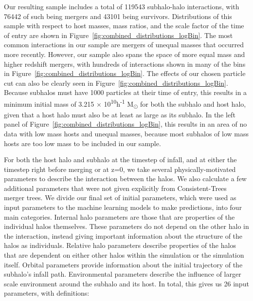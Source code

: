 \documentclass[fleqn,usenatbib]{mnras}
\begin{document}
    Our resulting sample includes a total of 119543 subhalo-halo interactions, with 76442 of such being mergers and 43101 being survivors. Distributions of this sample with respect to host masses, mass ratios, and the scale factor of the time of entry are shown in Figure~\ref{fig:combined_distributions_logBin}. The most common interactions in our sample are mergers of unequal masses that occurred more recently. However, our sample also spans the space of more equal mass and higher redshift mergers, with hundreds of interactions shown in many of the bins in Figure~\ref{fig:combined_distributions_logBin}. The effects of our chosen particle cut can also be clearly seen in Figure~\ref{fig:combined_distributions_logBin}. Because subhalos must have 1000 particles at their time of entry, this results in a minimum initial mass of 3.215 $\times$ 10\textsuperscript{10}h\textsuperscript{-1} M\textsubscript{\(\odot\)} for both the subhalo and host halo, given that a host halo must also be at least as large as its subhalo. In the left panel of Figure~\ref{fig:combined_distributions_logBin}, this results in an area of no data with low mass hosts and unequal masses, because most subhalos of low mass hosts are too low mass to be included in our sample.
\par
    For both the host halo and subhalo at the timestep of infall, and at either the timestep right before merging or at z=0, we take several physically-motivated parameters to describe the interaction between the halos. We also calculate a few additional parameters that were not given explicitly from Consistent-Trees merger trees. We divide our final set of initial parameters, which were used as input parameters to the machine learning models to make predictions, into four main categories. Internal halo parameters are those that are properties of the individual halos themselves. These parameters do not depend on the other halo in the interaction, instead giving important information about the structure of the halos as individuals. Relative halo parameters describe properties of the halos that are dependent on either other halos within the simulation or the simulation itself. Orbital parameters provide information about the initial trajectory of the subhalo's infall path. Environmental parameters describe the influence of larger scale environment around the subhalo and its host. In total, this gives us 26 input parameters, with definitions:
    
\end{document}
